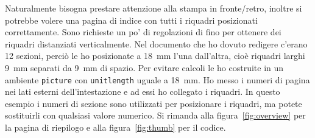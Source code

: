 \documentclass[a4paper,italian]{article}
\newcommand{\bs}{\symbol{'134}}
\newcommand{\Cmd}[1]{\texttt{\def\{{\char`\{}\def\}{\char`\}}\bs#1}}
\begin{document}
Naturalmente bisogna prestare attenzione alla stampa in fronte/retro,
inoltre si potrebbe volere una pagina di indice con tutti i riquadri posizionati
correttamente. Sono richieste un po' di regolazioni di fino per
ottenere dei riquadri distanziati verticalmente.
Nel documento che ho dovuto redigere c'erano 12 sezioni, perci\`o le ho
posizionate a 18~mm l'una dall'altra, cio\`e riquadri larghi 9~mm separati
da 9~mm di spazio. Per evitare calcoli le ho costruite in un ambiente
\texttt{picture} con \Cmd{unitlength} uguale a 18~mm. Ho messo i numeri
di pagina nei lati esterni dell'intestazione e ad essi ho collegato i
riquadri. In questo esempio i numeri di sezione sono utilizzati per
posizionare i riquadri, ma potete sostituirli con qualsiasi valore
numerico. 
Si rimanda alla figura~\ref{fig:overview} per la pagina di riepilogo e alla
figura~\ref{fig:thumb} per il codice.
\end{document}
